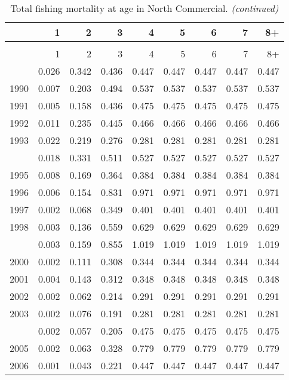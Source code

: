 \documentclass[
]{article}
\begin{document}
\begin{longtable}[t]{lrrrrrrrr}
\caption{\label{tab:North_Commercial-fleet-FAA-table}Total fishing mortality at age in North Commercial.}\\
\toprule
  & 1 & 2 & 3 & 4 & 5 & 6 & 7 & 8+\\
\midrule
\endfirsthead
\caption[]{Total fishing mortality at age in North Commercial. \textit{(continued)}}\\
\toprule
  & 1 & 2 & 3 & 4 & 5 & 6 & 7 & 8+\\
\midrule
\endhead

\endfoot
\bottomrule
\endlastfoot
1989 & 0.026 & 0.342 & 0.436 & 0.447 & 0.447 & 0.447 & 0.447 & 0.447\\
1990 & 0.007 & 0.203 & 0.494 & 0.537 & 0.537 & 0.537 & 0.537 & 0.537\\
1991 & 0.005 & 0.158 & 0.436 & 0.475 & 0.475 & 0.475 & 0.475 & 0.475\\
1992 & 0.011 & 0.235 & 0.445 & 0.466 & 0.466 & 0.466 & 0.466 & 0.466\\
1993 & 0.022 & 0.219 & 0.276 & 0.281 & 0.281 & 0.281 & 0.281 & 0.281\\
\addlinespace
1994 & 0.018 & 0.331 & 0.511 & 0.527 & 0.527 & 0.527 & 0.527 & 0.527\\
1995 & 0.008 & 0.169 & 0.364 & 0.384 & 0.384 & 0.384 & 0.384 & 0.384\\
1996 & 0.006 & 0.154 & 0.831 & 0.971 & 0.971 & 0.971 & 0.971 & 0.971\\
1997 & 0.002 & 0.068 & 0.349 & 0.401 & 0.401 & 0.401 & 0.401 & 0.401\\
1998 & 0.003 & 0.136 & 0.559 & 0.629 & 0.629 & 0.629 & 0.629 & 0.629\\
\addlinespace
1999 & 0.003 & 0.159 & 0.855 & 1.019 & 1.019 & 1.019 & 1.019 & 1.019\\
2000 & 0.002 & 0.111 & 0.308 & 0.344 & 0.344 & 0.344 & 0.344 & 0.344\\
2001 & 0.004 & 0.143 & 0.312 & 0.348 & 0.348 & 0.348 & 0.348 & 0.348\\
2002 & 0.002 & 0.062 & 0.214 & 0.291 & 0.291 & 0.291 & 0.291 & 0.291\\
2003 & 0.002 & 0.076 & 0.191 & 0.281 & 0.281 & 0.281 & 0.281 & 0.281\\
\addlinespace
2004 & 0.002 & 0.057 & 0.205 & 0.475 & 0.475 & 0.475 & 0.475 & 0.475\\
2005 & 0.002 & 0.063 & 0.328 & 0.779 & 0.779 & 0.779 & 0.779 & 0.779\\
2006 & 0.001 & 0.043 & 0.221 & 0.447 & 0.447 & 0.447 & 0.447 & 0.447\\

\end{longtable}
\end{document}

